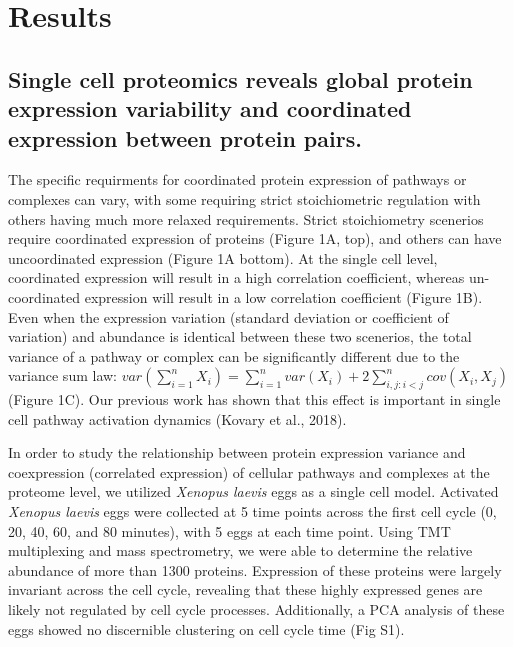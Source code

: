 \documentclass[11pt,]{article}
\begin{document}
\hypertarget{results}{%
\section{Results}\label{results}}

\hypertarget{single-cell-proteomics-reveals-global-protein-expression-variability-and-coordinated-expression-between-protein-pairs.}{%
\subsection{Single cell proteomics reveals global protein expression
variability and coordinated expression between protein
pairs.}\label{single-cell-proteomics-reveals-global-protein-expression-variability-and-coordinated-expression-between-protein-pairs.}}

The specific requirments for coordinated protein expression of pathways
or complexes can vary, with some requiring strict stoichiometric
regulation with others having much more relaxed requirements. Strict
stoichiometry scenerios require coordinated expression of proteins
(Figure 1A, top), and others can have uncoordinated expression (Figure
1A bottom). At the single cell level, coordinated expression will result
in a high correlation coefficient, whereas un-coordinated expression
will result in a low correlation coefficient (Figure 1B). Even when the
expression variation (standard deviation or coefficient of variation)
and abundance is identical between these two scenerios, the total
variance of a pathway or complex can be significantly different due to
the variance sum law:
\(var\left(\sum_{i=1}^n X_{i}\right) = \sum_{i=1}^{n} var(X_{i}) + 2\sum_{i,j:i<j}^{n} cov(X_{i},X_{j})\)
(Figure 1C). Our previous work has shown that this effect is important
in single cell pathway activation dynamics (Kovary et al., 2018).

In order to study the relationship between protein expression variance
and coexpression (correlated expression) of cellular pathways and
complexes at the proteome level, we utilized \emph{Xenopus laevis} eggs
as a single cell model. Activated \emph{Xenopus laevis} eggs were
collected at 5 time points across the first cell cycle (0, 20, 40, 60,
and 80 minutes), with 5 eggs at each time point. Using TMT multiplexing
and mass spectrometry, we were able to determine the relative abundance
of more than 1300 proteins. Expression of these proteins were largely
invariant across the cell cycle, revealing that these highly expressed
genes are likely not regulated by cell cycle processes. Additionally, a
PCA analysis of these eggs showed no discernible clustering on cell
cycle time (Fig S1).
\end{document}
